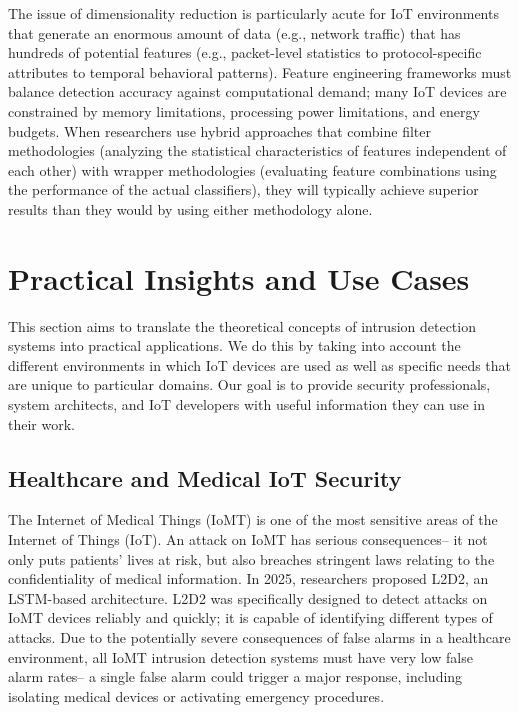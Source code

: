 \documentclass[12pt]{article}
\begin{document}
The issue of dimensionality reduction is particularly acute for IoT environments that generate an enormous amount of data (e.g., network traffic) that has hundreds of potential features (e.g., packet-level statistics to protocol-specific attributes to temporal behavioral patterns). Feature engineering frameworks must balance detection accuracy against computational demand; many IoT devices are constrained by memory limitations, processing power limitations, and energy budgets. When researchers use hybrid approaches that combine filter methodologies (analyzing the statistical characteristics of features independent of each other) with wrapper methodologies (evaluating feature combinations using the performance of the actual classifiers), they will typically achieve superior results than they would by using either methodology alone.
    

	\section{Practical Insights and Use Cases}

This section aims to translate the theoretical concepts of intrusion detection systems into practical applications. We do this by taking into account the different environments in which IoT devices are used as well as specific needs that are unique to particular domains. Our goal is to provide security professionals, system architects, and IoT developers with useful information they can use in their work.

\subsection{Healthcare and Medical IoT Security}

The Internet of Medical Things (IoMT) is one of the most sensitive areas of the Internet of Things (IoT). An attack on IoMT has serious consequences– it not only puts patients’ lives at risk, but also breaches stringent laws relating to the confidentiality of medical information. In 2025, researchers proposed L2D2, an LSTM-based architecture. L2D2 was specifically designed to detect attacks on IoMT devices reliably and quickly; it is capable of identifying different types of attacks. Due to the potentially severe consequences of false alarms in a healthcare environment, all IoMT intrusion detection systems must have very low false alarm rates– a single false alarm could trigger a major response, including isolating medical devices or activating emergency procedures.
\end{document}
